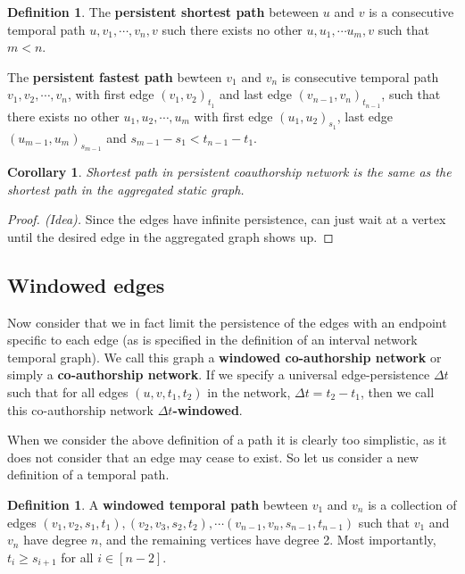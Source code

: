 \documentclass{article}
\newtheorem{cor}[thm]{Corollary}
\theoremstyle{definition}
\newtheorem{defn}[thm]{Definition}
\numberwithin{thm}{subsection}
\begin{document}
\begin{defn}
  The \textbf{persistent shortest path} beteween $u$ and $v$ is a consecutive
  temporal path $u,v_1,\cdots,v_n,v$ such there exists no other $u,u_1, \cdots
  u_m,v$ such that $m < n$.

  The \textbf{persistent fastest path} bewteen $v_1$ and $v_n$ is consecutive
  temporal path $v_1,v_2,\cdots,v_n$, with first edge $(v_1,v_2)_{t_1}$ and last
  edge $(v_{n-1},v_n)_{t_{n-1}}$, such that there exists no other
  $u_1,u_2, \cdots, u_m$ with first edge $(u_1,u_2)_{s_1}$, last edge
  $(u_{m-1},u_m)_{s_{m-1}}$ and $s_{m-1} - s_1 < t_{n-1} - t_{1}$.
\end{defn}


\begin{cor}
  Shortest path in persistent coauthorship network is the same as the shortest
  path in the aggregated static graph.
\end{cor}

\begin{proof}[Proof. (Idea)]
  Since the edges have infinite persistence, can just wait at a vertex until
  the desired edge in the aggregated graph shows up.
\end{proof}


\subsection{Windowed edges}

Now consider that we in fact limit the persistence of the edges with an endpoint
specific to each edge (as is specified in the definition of an interval network
temporal graph). We call this graph a \textbf{windowed co-authorship network} or
simply a \textbf{co-authorship network}. If we specify a universal
edge-persistence $\Delta t$ such that for all edges $(u,v,t_1,t_2)$ in the
network, $\Delta t = t_2 - t_1$, then we call this co-authorship network
\textbf{$\Delta t$-windowed}.

When we consider the above definition of a path it is clearly too
simplistic, as it does not consider that an edge may cease to exist. So let
us consider a new definition of a temporal path.

\begin{defn}
  A \textbf{windowed temporal path} bewteen $v_1$ and $v_n$ is a collection of
  edges $(v_1,v_2,s_1,t_1),(v_2,v_3,s_2,t_2), \cdots (v_{n-1},v_{n}, s_{n-1},
  t_{n-1})$ such that $v_1$ and $v_n$ have degree $n$, and the remaining
  vertices have degree 2.  Most importantly, $t_i \geq s_{i+1}$ for all $i \in
  [n-2]$.
\end{defn}
\end{document}
